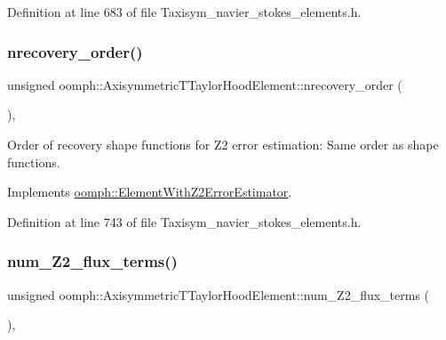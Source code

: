 Definition at line 683 of file Taxisym\+\_\+navier\+\_\+stokes\+\_\+elements.\+h.

\mbox{\label{classoomph_1_1AxisymmetricTTaylorHoodElement_a2cd7e8c1aafe58b6cc36eef0b201b9f2}} 
\subsubsection{\texorpdfstring{nrecovery\+\_\+order()}{nrecovery\_order()}}
{\footnotesize\ttfamily unsigned oomph\+::\+Axisymmetric\+T\+Taylor\+Hood\+Element\+::nrecovery\+\_\+order (\begin{DoxyParamCaption}{ }\end{DoxyParamCaption})\hspace{0.3cm}{\ttfamily [inline]}, {\ttfamily [virtual]}}



Order of recovery shape functions for Z2 error estimation\+: Same order as shape functions. 



Implements \hyperlink{classoomph_1_1ElementWithZ2ErrorEstimator_af39480835bd3e0f6b2f4f7a9a4044798}{oomph\+::\+Element\+With\+Z2\+Error\+Estimator}.



Definition at line 743 of file Taxisym\+\_\+navier\+\_\+stokes\+\_\+elements.\+h.

\mbox{\label{classoomph_1_1AxisymmetricTTaylorHoodElement_ae84ae5860bbfdd54a5f8224f3b0caf46}} 
\subsubsection{\texorpdfstring{num\+\_\+\+Z2\+\_\+flux\+\_\+terms()}{num\_Z2\_flux\_terms()}}
{\footnotesize\ttfamily unsigned oomph\+::\+Axisymmetric\+T\+Taylor\+Hood\+Element\+::num\+\_\+\+Z2\+\_\+flux\+\_\+terms (\begin{DoxyParamCaption}{ }\end{DoxyParamCaption})\hspace{0.3cm}{\ttfamily [inline]}, {\ttfamily [virtual]}}



